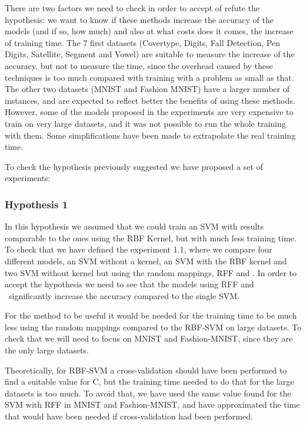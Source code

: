 \begin{pre-delivery}

  There are two factors we need to check in order to accept of refute the
  hypothesis: we want to know if these methods increase the accuracy of the
  models (and if so, how much) and also at what costs does it comes, the
  increase of training time. The 7 first datasets (Covertype, Digits, Fall
  Detection, Pen Digits, Satellite, Segment and Vowel) are suitable to measure
  the increase of the accuracy, but not to measure the time, since the
  overhead caused by these techniques is too much compared with training
  with a problem as small as that. The other two datasets (MNIST and Fashion
  MNIST) have a larger number of instances, and are expected to reflect
  better the benefits of using these methods.
  However, some of the models proposed in the experiments are very expensive to
  train on very large datasets, and it was not possible to run the whole training
  with them. Some simplifications have been made to extrapolate the real
  training time.

  To check the hypothesis previously suggested we have proposed a set of
  experiments:

  \subsubsection*{Hypothesis 1}
  In this hypothesis we assumed that we could train an SVM with results comparable
  to the ones using the RBF Kernel, but with much less training time. To
  check that we have defined the experiment 1.1, where we compare four different
  models, an SVM without a kernel, an SVM with the RBF kernel and two SVM
  without kernel but using the random mappings, RFF and \Nys. In order to accept
  the hypothesis we need to see that the models using RFF and \Nys\ significantly
  increase the accuracy compared to the single SVM.

  For the method to be useful it would be needed for the training time to
  be much less using the random mappings compared to the RBF-SVM on large datasets.
  To check that we will need to focus on MNIST and Fashion-MNIST, since they
  are the only large datasets.

  Theoretically, for RBF-SVM a cross-validation should have been performed to
  find a suitable value for C, but the training time needed to do that for the
  large datasets is too much. To avoid that, we have used the same value found
  for the SVM with RFF in MNIST and Fashion-MNIST, and have approximated the
  time that would have been needed if cross-validation had been performed.


\end{pre-delivery}
